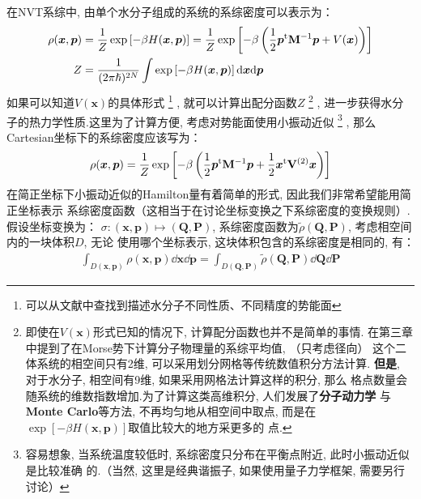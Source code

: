     在NVT系综中, 由单个水分子组成的系统的系综密度可以表示为：
    \begin{equation}
        \begin{split}
            \rho(\bm{x}, \bm{p}) &= \frac{1}{Z}\exp\left[-\beta H(\bm{x}, \bm{p})\right]
            = \frac{1}{Z}\exp\left[-\beta\left(\frac{1}{2}\bm{p}^{\mathrm{t}}\mathbf{M}^{-1}\bm{p} + V(\bm{x})\right)\right]\\
            Z &= \frac{1}{(2\pi\hslash)^{2N}}\int\exp\left[-\beta H(\bm{x}, \bm{p})\right]\mathrm{d} \bm{x}\mathrm{d} \bm{p}
        \end{split}
    \end{equation}
    如果可以知道$V(\bm{x})$的具体形式
    \footnote{可以从文献中查找到描述水分子不同性质、不同精度的势能面}
    , 就可以计算出配分函数$Z$
    \footnote{即使在$V(\bm{x})$形式已知的情况下, 计算配分函数也并不是简单的事情.
    在第三章中提到了在Morse势下计算分子物理量的系综平均值, （只考虑径向）
    这个二体系统的相空间只有2维, 可以采用划分网格等传统数值积分方法计算.
    \textbf{但是}, 对于水分子, 相空间有9维, 如果采用网格法计算这样的积分, 那么
    格点数量会随系统的维数指数增加.为了计算这类高维积分, 人们发展了\textbf{分子动力学}
    与\textbf{Monte Carlo}等方法, 不再均匀地从相空间中取点, 而是在
    $\exp\left[-\beta H(\bm{x}, \bm{p})\right]$取值比较大的地方采更多的
    点.}
    , 进一步获得水分子的热力学性质.这里为了计算方便, 考虑对势能面使用小振动近似
    \footnote{
        容易想象, 当系统温度较低时, 系综密度只分布在平衡点附近, 此时小振动近似是比较准确
        的.（当然, 这里是经典谐振子, 如果使用量子力学框架, 需要另行讨论）
    }
    , 那么Cartesian坐标下的系综密度应该写为：
    \begin{equation}
        \begin{split}
            \rho(\bm{x}, \bm{p}) = \frac{1}{Z}\exp\left[-\beta\left(
                \frac{1}{2}\bm{p}^{\mathrm{t}}\mathbf{M}^{-1}\bm{p} + \frac{1}{2}\bm{x}^{\mathrm{t}}
                \mathbf{V}^{(2)}\bm{x}
            \right)\right]
        \end{split}
    \end{equation}
    在简正坐标下小振动近似的Hamilton量有着简单的形式, 因此我们非常希望能用简正坐标表示
    系综密度函数（这相当于在讨论坐标变换之下系综密度的变换规则）.假设坐标变换为：
    $\sigma: (\bm{x}, \bm{p})\mapsto(\bm{Q}, \bm{P})$, 
    系综密度函数为$\tilde{\rho}(\bm{Q}, \bm{P})$, 考虑相空间内的一块体积$D$, 无论
    使用哪个坐标表示, 这块体积包含的系综密度是相同的, 有：
    \begin{equation}
        \begin{split}
            \int_{D(\bm{x},\bm{p})}\rho(\bm{x}, \bm{p})\dd \bm{x}\dd \bm{p}
             = \int_{D(\bm{Q}, \bm{P})}\tilde{\rho}(\bm{Q}, \bm{P})\dd \bm{Q}\dd \bm{P}
        \end{split}
    \end{equation}
